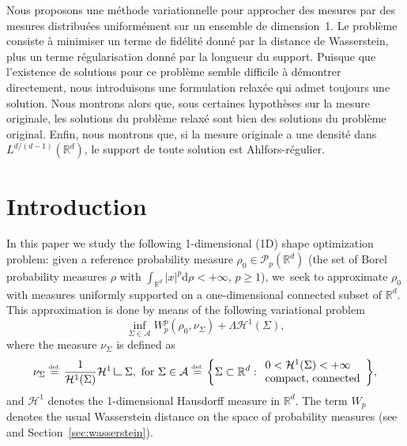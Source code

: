 \documentclass[JEP,XML,SOM,Unicode,NoFloatCountersInSection,published]{cedram}
\theoremstyle{definition}
\newcommand{\eqdef}{\ensuremath{\stackrel{\mbox{\upshape\tiny def.}}{=}}}
\newcommand\LM[1]{\hbox{\vrule width.5pt \vbox to#1pt{\vfill \hrule width#1pt height.5pt}}}
\newcommand\LL{{\mathchoice {\>\LM7\>}{\>\LM7\>}{\,\LM5\,}{\,\LM{3.35}\,}}}
\newcommand{\mres}{\LL}
\newcommand\cH{\mathcal{H}}
\newcommand{\RR}{\mathbb{R}}
\newcommand\dd{\mathrm{d}}
\begin{document}

\begin{altabstract}
Nous proposons une méthode variationnelle pour approcher des mesures par des mesures distribuées uniformément sur un ensemble de dimension~1. Le problème consiste à minimiser un terme de fidélité donné par la distance de Wasserstein, plus un terme régularisation donné par la longueur du support. Puisque que l'existence de solutions pour ce problème semble difficile à démontrer directement, nous introduisons une formulation relaxée qui admet toujours une solution. Nous montrons alors que, sous certaines hypothèses sur la mesure originale, les solutions du problème relaxé sont bien des solutions du problème original. Enfin, nous montrons que, si la mesure originale a une densité dans $L^{d/(d-1)}(\mathbb{R}^d)$, le support de toute solution est Ahlfors-régulier.
\end{altabstract}
\maketitle

\vspace*{-1.5\baselineskip}
\tableofcontents
\mainmatter

\section{Introduction}\label{section.introduction}
In this paper we study the following 1-dimensional (1D) shape optimization
problem: given a reference probability measure
$\rho_0 \in \mathcal{P}_p(\RR^d)$ (the set of
Borel probability measures $\rho$ with $\int_{\RR^d}|x|^p \dd \rho<+\infty$, $p\ge 1$), we~seek to approximate $\rho_0$ with measures uniformly supported on a one-dimensional connected subset of $\RR^d$.
This approximation is done by means of the following variational problem
\begin{equation}
\label{problem.shape_optimization}
\tag{$P_\Lambda$}
\inf_{\Sigma \in \mathcal{A}}
W_p^p(\rho_0, \nu_{\Sigma}) + \Lambda \cH^1(\Sigma),
\end{equation}
where the measure $\nu_{\Sigma}$ is defined as
\begin{equation}\label{admissible_set}
\nu_{\Sigma} \eqdef \frac{1}{\cH^1(\Sigma)} \cH^1\mres \Sigma, \text{ for } \Sigma \in
\mathcal{A}\eqdef
\biggl\{
\Sigma \subset \RR^d :
\begin{array}{l}
0 < \mathcal{H}^1(\Sigma) < +\infty \\
\text{compact, connected}
\end{array}
\biggr\},
\end{equation}
and $\mathcal{H}^1$ denotes the 1-dimensional Hausdorff measure in $\RR^d$. The term $W_p$ denotes the usual Wasserstein distance on the space of probability measures (see~\cite{santambrogio2015optimal,villani2009optimal}
and Section~\ref{sec:wasserstein}).
\end{document}
